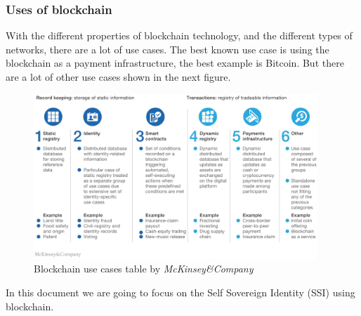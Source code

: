 \documentclass[a4paper, 12pt]{article} %
\begin{document}
            \subsubsection{Uses of blockchain}
                With the different properties of blockchain technology, and the different types of networks, there are a lot of use cases. The best known use case is using the blockchain as a payment infrastructure, the best example is Bitcoin. But there are a lot of other use cases shown in the next figure.\\
                \begin{figure}[h]
                    \centering
                    \includegraphics[width=0.95\textwidth]{Blockchain-uses.png}
                    \caption{Blockchain use cases table by \textit{McKinsey\&Company}}
                    \label{fig:blockchain_uses}
                \end{figure}
                
                In this document we are going to focus on the Self Sovereign Identity (SSI) using blockchain.
\end{document}
